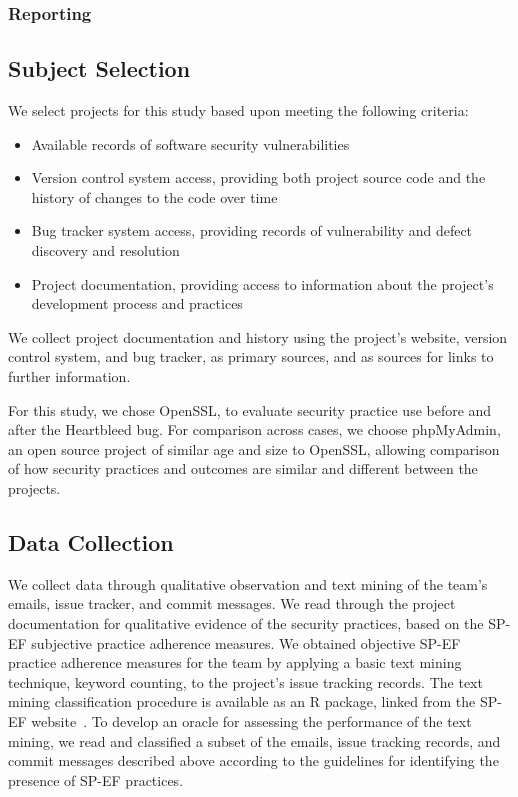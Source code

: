 \subsubsection{Reporting}

\subsection{Subject Selection}
We select projects for this study based upon meeting the following criteria:
\begin{itemize}

\item Available records of software security vulnerabilities
\item Version control system access, providing both project source code and the history of changes to the code over time
\item Bug tracker system access, providing records of vulnerability and defect discovery and resolution
\item Project documentation, providing access to information about the project’s development process and practices
\end{itemize}

We collect project documentation and history using the project’s website, version control system, and bug tracker, as primary sources, and as sources for links to further information. 

For this study, we chose OpenSSL, to evaluate security practice use before and after the Heartbleed bug.  For comparison across cases, we choose phpMyAdmin, an open source project of similar age and size to OpenSSL, allowing comparison of how security practices and outcomes are similar and different between the projects. 

\subsection{Data Collection}

We collect data through qualitative observation and text mining of the team's emails, issue tracker, and commit messages. We read through the project documentation for qualitative evidence of the security practices, based on the SP-EF subjective practice adherence measures. We obtained objective SP-EF practice adherence measures for the team by applying a basic text mining technique, keyword counting, to the project's issue tracking records. The text mining classification procedure is available as an R package, linked from the SP-EF website~\cite{morrison2016spef}.   To develop an oracle for assessing the performance of the text mining, we read and classified a subset of the emails, issue tracking records, and commit messages described above according to the guidelines for identifying the presence of SP-EF practices. 

